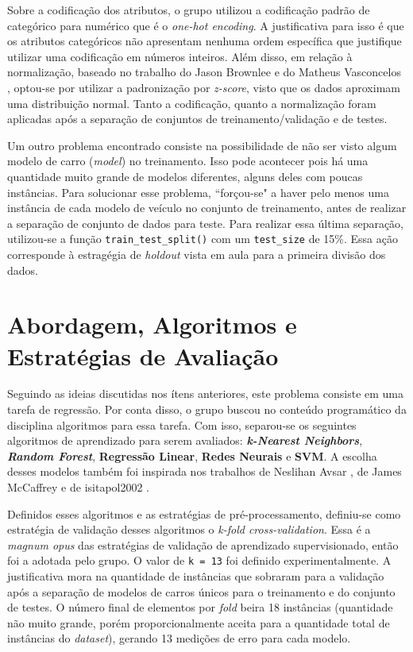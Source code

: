 \documentclass{report}
\let\oldsection\section
\renewcommand\section{\clearpage\oldsection}
\begin{document}
Sobre a codificação dos atributos, o grupo utilizou a codificação padrão de categórico para numérico que é o \textit{one-hot encoding}. A justificativa para isso é que os atributos categóricos não
apresentam nenhuma ordem específica que justifique utilizar uma codificação em números inteiros. Além disso, em relação à normalização, baseado no trabalho do Jason Brownlee \cite{ColumnTransformer} e
do Matheus Vasconcelos \cite{PadronizarDados}, optou-se por utilizar a padronização por \textit{z-score}, visto que os dados aproximam uma distribuição normal. Tanto a codificação, quanto a normalização
foram aplicadas após a separação de conjuntos de treinamento/validação e de testes.

Um outro problema encontrado consiste na possibilidade de não ser visto algum modelo de carro (\textit{model}) no treinamento. Isso pode acontecer pois há uma quantidade muito grande de modelos diferentes,
alguns deles com poucas instâncias. Para solucionar esse problema, ``forçou-se" a haver pelo menos uma instância de cada modelo de veículo no conjunto de treinamento, antes de realizar a separação de
conjunto de dados para teste. Para realizar essa última separação, utilizou-se a função \texttt{train\_test\_split()} com um \texttt{test\_size} de 15\%. Essa ação corresponde à estragégia de \textit{holdout}
vista em aula para a primeira divisão dos dados.

\section{Abordagem, Algoritmos e Estratégias de Avaliação}

Seguindo as ideias discutidas nos ítens anteriores, este problema consiste em uma tarefa de regressão. Por conta disso, o grupo buscou no conteúdo programático da disciplina algoritmos para essa tarefa.
Com isso, separou-se os seguintes algoritmos de aprendizado para serem avaliados: \textbf{\textit{k-Nearest Neighbors}}, \textbf{\textit{Random Forest}}, \textbf{Regressão Linear}, \textbf{Redes Neurais}
e \textbf{SVM}. A escolha desses modelos também foi inspirada nos trabalhos de Neslihan Avsar \cite{LinearRegression}, de James McCaffrey \cite{Regression} e de isitapol2002 \cite{MultRegression}.

Definidos esses algoritmos e as estratégias de pré-processamento, definiu-se como estratégia de validação desses algoritmos o \textit{k-fold cross-validation}. Essa é a \textit{magnum opus} das estratégias
de validação de aprendizado supervisionado, então foi a adotada pelo grupo. O valor de \texttt{k = 13} foi definido experimentalmente. A justificativa mora na quantidade de instâncias que
sobraram para a validação após a separação de modelos de carros únicos para o treinamento e do conjunto de testes. O número final de elementos por \textit{fold} beira 18 instâncias (quantidade não muito grande,
porém proporcionalmente aceita para a quantidade total de instâncias do \textit{dataset}), gerando 13 medições de erro para cada modelo.
\end{document}
